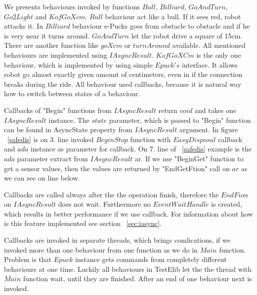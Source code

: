	We presents behaviours invoked by functions $Bull$, $Billiard$, $GoAndTurn$,$Go2Light$ and $KofGoXcm$.
	$Bull$ behaviour act like a bull. If it sees red, robot attacks it. In $Billiard$ behaviour e-Pucks goes from obstacle to obstacle
	and if he is very near it turns around.
	$GoAndTurn$ let the robot drive a square of 15cm. There are another function like $goXcm$ or $turnAround$ available.
	All mentioned behaviours are implemented using $IAsyncResult$. 
	$KofGoXCm$ is the only one behaviour, which is implemented by using simple $Epuck's$ interface.
	It allows robot go almost exactly given amount of centimeters, even in if the connection breaks during the ride.
	All behaviour used  callbacks, because it is natural way how to switch between states of a behaviour.

	Callbacks of "Begin" functions from $IAsyncResult$ return $void$ and takes one $IAsyncResult$ instance.
	The $state$ parameter, which is passed to "Begin" function can be found in AsyncState property from $IAsyncResult$ argument.
	In figure ~\ref{safedis} is on 3. line invoked $BeginStop$ function with $EasyDisposal$ callback and $ada$ instance as parameter for callback.
	On 7. line of ~\ref{safedis} example is the $ada$ parameter extract from $IAsyncResult$ ar.
	If we use "BeginGet" function to get a sensor values, then the values are returned by "EndGetFtion" call on $ar$ as we can see
	on line below.

	Callbacks are called always after the the operation finish, therefore the $EndFion$ on $IAsyncResult$ does not wait.
	Furthermore no $EventWaitHandle$ is created, which results in better performance if we use callback.
	For information about how is this feature implemented see section ~\ref{sec:iasync}.

	Callbacks are invoked in separate threads, which brings comlications, if we invoked more than one behaviour
	from one function as we do in $Main$ function. Problem is that $Epuck$ instance gets 
	commands from completely different behaviours at one time.
	Luckily all behaviours in TestElib let the the thread with $Main$ function wait, until they are finished.
	After an end of one behaviour next is invoked.

